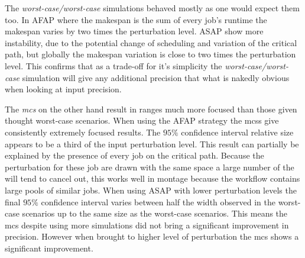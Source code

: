 \documentclass[10pt,conference,compsocconf]{IEEEtran}
\begin{document}
The \emph{worst-case/worst-case} simulations behaved mostly as one would expect
them too. In AFAP where the makespan is the sum of every job's runtime the
makespan varies by two times the perturbation level. ASAP show more instability,
due to the potential change of scheduling and variation of the critical path,
but globally the makespan variation is close to two times the perturbation
level. This confirms that as a trade-off for it's simplicity the
\emph{worst-case/worst-case} simulation will give any additional precision that
what is nakedly obvious when looking at input precision. 

The \emph{\acl{mcs}} on the other hand result in ranges much more focused than
those given thought worst-case scenarios. When using the AFAP strategy the
\acp{mcs} give consistently extremely focused results. The $95\%$ confidence interval
relative size appears to be a third of the input perturbation level. This result
can partially be explained by the presence of every job on the critical path.
Because the perturbation for these job are drawn with the same space a large
number of the will tend to cancel out, this works well in montage because the
workflow contains large pools of similar jobs. When using ASAP with lower
perturbation levels the final $95\%$ confidence interval varies between half the
width observed in the worst-case scenarios up to the same size as the worst-case
scenarios. This means the \ac{mcs} despite using more simulations did not bring
a significant improvement in precision. However when brought to higher level of
perturbation the \ac{mcs} shows a significant improvement.




\end{document}
